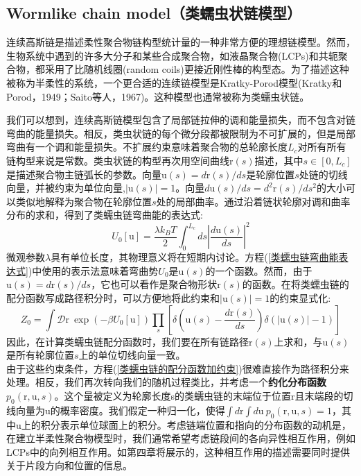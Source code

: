 \subsection{Wormlike chain model（类蠕虫状链模型）}
\centering
\author{wx}

连续高斯链是描述柔性聚合物链构型统计量的一种非常方便的理想链模型。然而，生物系统中遇到的许多大分子和某些合成聚合物，如液晶聚合物(LCPs)和共轭聚合物，都采用了比随机线圈(random coils)更接近刚性棒的构型态。为了描述这种被称为半柔性的系统，一个更合适的连续链模型是Kratky-Porod模型(Kratky和Porod，1949；Saito等人，1967)。这种模型也通常被称为类蠕虫状链。

我们可以想到，连续高斯链模型包含了局部链拉伸的调和能量损失，而不包含对链弯曲的能量损失。相反，类虫状链的每个微分段都被限制为不可扩展的，但是局部弯曲有一个调和能量损失。不扩展约束意味着聚合物的总轮廓长度$L_c$对所有所有链构型来说是常数。类虫状链的构型再次用空间曲线$\mathrm{r}(s)$描述，其中$s\in [0,L_c]$是描述聚合物主链弧长的参数。向量$\mathrm{u}(s)=d\mathrm{r}(s)/ds$是轮廓位置$s$处链的切线向量，并被约束为单位向量,$|\mathrm{u}(s)| =1$。向量$d\mathrm{u}(s)/ds=d^2\mathrm{r}(s)/ds^2$的大小可以类似地解释为聚合物在轮廓位置$s$处的局部曲率。通过沿着链状轮廓对调和曲率分布的求和，得到了类蠕虫链弯曲能的表达式:\\
\begin{equation}
	U_0[\mathrm{u}]=\frac{\lambda k_B T}{2}\int_{0}^{L_c}ds|\frac{d\mathrm{u}(s)}{ds}|^2 \label{类蠕虫链弯曲能表达式}
\end{equation}
微观参数$\lambda$具有单位长度，其物理意义将在短期内讨论。方程(\ref{类蠕虫链弯曲能表达式})中使用的表示法意味着弯曲势$U_0$是$\mathrm{u}(s)$的一个函数。然而，由于$\mathrm{u}(s)=d\mathrm{r}(s)/ds$，它也可以看作是聚合物形状$\mathrm{r}(s)$的函数。在将类蠕虫链的配分函数写成路径积分时，可以方便地将此约束和$|\mathrm{u}(s)|=1$的约束显式化:\\
\begin{equation}
	Z_0=\int \mathcal{D} \mathrm{r}\ \exp (-\beta U_0[\mathrm{u}])\prod_s\left[\delta\left(\mathrm{u}(s)-\frac{d\mathrm{r}(s)}{ds}\right)\delta(|\mathrm{u}(s)|-1)\right]\label{类蠕虫链的配分函数加约束}
\end{equation}
因此，在计算类蠕虫链配分函数时，我们要在所有链路径$\mathrm{r}(s)$上求和，与$\mathrm{u}(s)$是所有轮廓位置$s$上的单位切线向量一致。\\

由于这些约束条件，方程(\ref{类蠕虫链的配分函数加约束})很难直接作为路径积分来处理。相反，我们再次转向我们的随机过程类比，并考虑一个\textbf{约化分布函数}$p_0(\mathrm{r},\mathrm{u},s)$。这个量被定义为轮廓长度s的类蠕虫链的末端位于位置$\mathrm{r}$且末端段的切线向量为$\mathrm{u}$的概率密度。我们假定一种归一化，使得$\int d\mathrm{r}\int d\mathrm{u} \ p_0(\mathrm{r},\mathrm{u},s)=1$，其中$\mathrm{u}$上的积分表示单位球面上的积分。考虑链端位置和指向的分布函数的动机是，在建立半柔性聚合物模型时，我们通常希望考虑链段间的各向异性相互作用，例如LCPs中的向列相互作用。如第四章将展示的，这种相互作用的描述需要同时提供关于片段方向和位置的信息。

